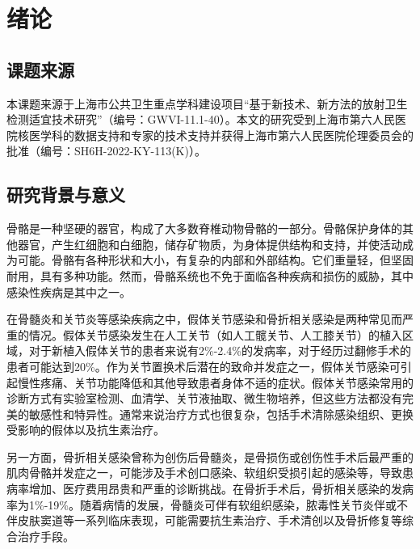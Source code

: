 \chapter{绪论}\label{chap:introduction}

\section{课题来源}

本课题来源于上海市公共卫生重点学科建设项目“基于新技术、新方法的放射卫生检测适宜技术研究”（编号：GWVI-11.1-40）。本文的研究受到上海市第六人民医院核医学科的数据支持和专家的技术支持并获得上海市第六人民医院伦理委员会的批准（编号：SH6H-2022-KY-113(K)）。

\section{研究背景与意义}

骨骼是一种坚硬的器官\cite{morgan2021bone}，构成了大多数脊椎动物骨骼的一部分。骨骼保护身体的其他器官，产生红细胞和白细胞，储存矿物质，为身体提供结构和支持，并使活动成为可能。骨骼有各种形状和大小，有复杂的内部和外部结构\cite{de2021vertebrate}。它们重量轻，但坚固耐用，具有多种功能。然而，骨骼系统也不免于面临各种疾病和损伤的威胁，其中感染性疾病是其中之一。

在骨髓炎和关节炎等感染疾病之中，假体关节感染和骨折相关感染是两种常见而严重的情况。假体关节感染发生在人工关节（如人工髋关节、人工膝关节）的植入区域，对于新植入假体关节的患者来说有2\%-2.4\%的发病率，对于经历过翻修手术的患者可能达到20\%\cite{sconfienza2019diagnosis}。作为关节置换术后潜在的致命并发症之一\cite{niccoli2017bone,usuelli2019infections}，假体关节感染可引起慢性疼痛、关节功能降低和其他导致患者身体不适的症状\cite{aleksyniene2022role}。假体关节感染常用的诊断方式有实验室检测、血清学、关节液抽取、微生物培养，但这些方法都没有完美的敏感性和特异性\cite{meermans2010there,parvizi2012mark,fink2013high,paul20142013,fink2018preoperative,claassen2014preoperative}。通常来说治疗方式也很复杂，包括手术清除感染组织、更换受影响的假体以及抗生素治疗。

另一方面，骨折相关感染曾称为创伤后骨髓炎，是骨损伤或创伤性手术后最严重的肌肉骨骼并发症之一\cite{govaert2020diagnosing}，可能涉及手术创口感染、软组织受损引起的感染等，导致患病率增加、医疗费用昂贵和严重的诊断挑战\cite{metsemakers2017infection}。在骨折手术后，骨折相关感染的发病率为1\%-19\%\cite{ktistakis2014infection, malhotra2014open}。随着病情的发展，骨髓炎可伴有软组织感染，脓毒性关节炎伴或不伴皮肤窦道等一系列临床表现\cite{bhoil2019role}，可能需要抗生素治疗、手术清创以及骨折修复等综合治疗手段。

